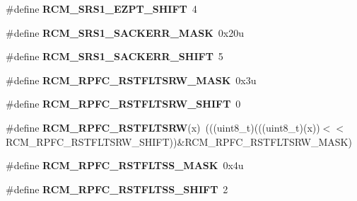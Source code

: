 \begin{DoxyCompactItemize}
\item 
\#define {\bfseries R\+C\+M\+\_\+\+S\+R\+S1\+\_\+\+E\+Z\+P\+T\+\_\+\+S\+H\+I\+FT}~4\hypertarget{group__RCM__Register__Masks_ga709ca27033c866f17c9e80ccf6df88b6}{}\label{group__RCM__Register__Masks_ga709ca27033c866f17c9e80ccf6df88b6}

\item 
\#define {\bfseries R\+C\+M\+\_\+\+S\+R\+S1\+\_\+\+S\+A\+C\+K\+E\+R\+R\+\_\+\+M\+A\+SK}~0x20u\hypertarget{group__RCM__Register__Masks_gaa09459c8ed6200a5828221f9d15656d3}{}\label{group__RCM__Register__Masks_gaa09459c8ed6200a5828221f9d15656d3}

\item 
\#define {\bfseries R\+C\+M\+\_\+\+S\+R\+S1\+\_\+\+S\+A\+C\+K\+E\+R\+R\+\_\+\+S\+H\+I\+FT}~5\hypertarget{group__RCM__Register__Masks_gab30a0b3f954edb8a480649686bd208fb}{}\label{group__RCM__Register__Masks_gab30a0b3f954edb8a480649686bd208fb}

\item 
\#define {\bfseries R\+C\+M\+\_\+\+R\+P\+F\+C\+\_\+\+R\+S\+T\+F\+L\+T\+S\+R\+W\+\_\+\+M\+A\+SK}~0x3u\hypertarget{group__RCM__Register__Masks_ga36e0fc448dc94b90314dd6dd2dd41763}{}\label{group__RCM__Register__Masks_ga36e0fc448dc94b90314dd6dd2dd41763}

\item 
\#define {\bfseries R\+C\+M\+\_\+\+R\+P\+F\+C\+\_\+\+R\+S\+T\+F\+L\+T\+S\+R\+W\+\_\+\+S\+H\+I\+FT}~0\hypertarget{group__RCM__Register__Masks_gad869b7629ba10023abe459d7293fd281}{}\label{group__RCM__Register__Masks_gad869b7629ba10023abe459d7293fd281}

\item 
\#define {\bfseries R\+C\+M\+\_\+\+R\+P\+F\+C\+\_\+\+R\+S\+T\+F\+L\+T\+S\+RW}(x)~(((uint8\+\_\+t)(((uint8\+\_\+t)(x))$<$$<$R\+C\+M\+\_\+\+R\+P\+F\+C\+\_\+\+R\+S\+T\+F\+L\+T\+S\+R\+W\+\_\+\+S\+H\+I\+FT))\&R\+C\+M\+\_\+\+R\+P\+F\+C\+\_\+\+R\+S\+T\+F\+L\+T\+S\+R\+W\+\_\+\+M\+A\+SK)\hypertarget{group__RCM__Register__Masks_ga9e84ee177022331e8509773374670eca}{}\label{group__RCM__Register__Masks_ga9e84ee177022331e8509773374670eca}

\item 
\#define {\bfseries R\+C\+M\+\_\+\+R\+P\+F\+C\+\_\+\+R\+S\+T\+F\+L\+T\+S\+S\+\_\+\+M\+A\+SK}~0x4u\hypertarget{group__RCM__Register__Masks_gadfb0f8132fbbc978c9756a2adfbf2ed0}{}\label{group__RCM__Register__Masks_gadfb0f8132fbbc978c9756a2adfbf2ed0}

\item 
\#define {\bfseries R\+C\+M\+\_\+\+R\+P\+F\+C\+\_\+\+R\+S\+T\+F\+L\+T\+S\+S\+\_\+\+S\+H\+I\+FT}~2\hypertarget{group__RCM__Register__Masks_ga4c39eb26fa537bf5e4e6b0ea82ffaeb2}{}\label{group__RCM__Register__Masks_ga4c39eb26fa537bf5e4e6b0ea82ffaeb2}


\end{DoxyCompactItemize}
